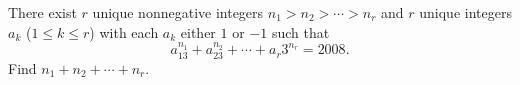 There exist $ r$ unique nonnegative integers $ n_1 > n_2 > \cdots > n_r$ and $ r$ unique integers $ a_k$ ($ 1\le k\le r$) with each $ a_k$ either $ 1$ or $ - 1$ such that
\[ a_13^{n_1} + a_23^{n_2} + \cdots + a_r3^{n_r} = 2008.
\]Find $ n_1 + n_2 + \cdots + n_r$.